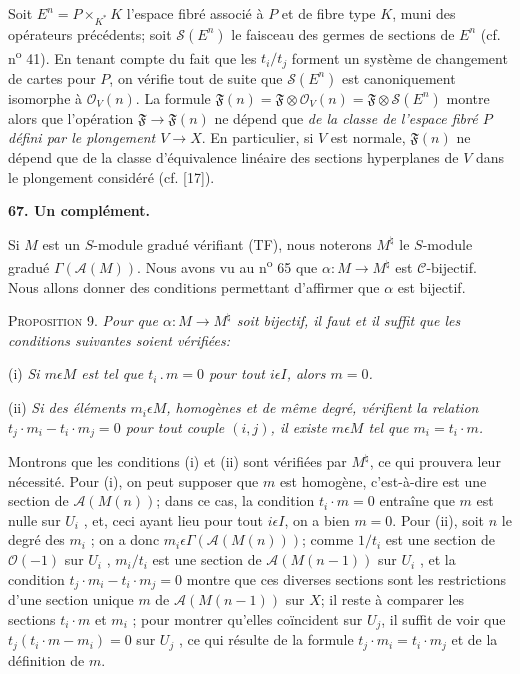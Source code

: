 Soit $E^n = P \times_{K^*} K$ l'espace fibré associé à $P$ et de fibre type $K$, muni des opérateurs précédents; soit $\mathcal{S}(E^n)$ le faisceau des germes de sections de $E^n$ (cf. n\textsuperscript{o} 41). En tenant compte du fait que les $t_i/t_j$ forment un système de changement de cartes pour $P$, on vérifie tout de suite que $\mathcal{S}(E^n)$ est canoniquement isomorphe à $\mathcal{O}_V(n)$. La formule $\mathfrak{F}(n) = \mathfrak{F} \otimes \mathcal{O}_V(n) = \mathfrak{F} \otimes \mathcal{S}(E^n)$ montre alors que l'opération $\mathfrak{F} \to \mathfrak{F}(n)$ ne dépend que \textit{de la classe de l'espace fibré $P$ défini par le plongement $V \to X$}. En particulier, si $V$ est normale, $\mathfrak{F}(n)$ ne dépend que de la classe d'équivalence linéaire des sections hyperplanes de $V$ dans le plongement considéré (cf. [17]).


\textbf{67. Un complément.}

Si $M$ est un $S$-module gradué vérifiant (TF), nous noterons $M^\natural$ le $S$-module gradué $\Gamma(\mathcal{A}(M))$. Nous avons vu au n\textsuperscript{o} 65 que $\alpha : M \to M^\natural$ est $\mathcal{C}$-bijectif. Nous allons donner des conditions permettant d'affirmer que $\alpha$ est bijectif.

\textsc{Proposition} 9. \textit{Pour que $\alpha : M \to M^\natural$ soit bijectif, il faut et il suffit que les conditions suivantes soient vérifiées:}

(i) \textit{Si $m \epsilon M$ est tel que $t_i\,.\,m = 0$ pour tout $i \epsilon I$, alors $m = 0$.}

(ii) \textit{Si des éléments $m_i \epsilon M$, homogènes et de même degré, vérifient la relation $t_j\cdot m_i - t_i\cdot m_j = 0$ pour tout couple $(i, j)$, il existe $m \epsilon M$ tel que $m_i = t_i\cdot m$.}

Montrons que les conditions (i) et (ii) sont vérifiées par $M^\natural$, ce qui prouvera leur nécessité. Pour (i), on peut supposer que $m$ est homogène, c'est-à-dire est une section de $\mathcal{A}(M(n))$; dans ce cas, la condition $t_i\cdot m = 0$ entraîne que $m$ est nulle sur $U_i$ , et, ceci ayant lieu pour tout $i \epsilon I$, on a bien $m = 0$. Pour (ii), soit $n$ le degré des $m_i$ ; on a donc $m_i \epsilon \Gamma(\mathcal{A}(M(n)))$; comme $1/t_i$ est une section de $\mathcal{O}(-1)$ sur $U_i$ , $m_i/t_i$ est une section de $\mathcal{A}(M(n - 1))$ sur $U_i$ , et la condition $t_j\cdot m_i - t_i\cdot m_j = 0$ montre que ces diverses sections sont les restrictions d'une section unique $m$ de $\mathcal{A}(M(n - 1))$ sur $X$; il reste à comparer les sections $t_i\cdot m$ et $m_i$ ; pour montrer qu'elles coïncident sur $U_j$, il suffit de voir que $t_j(t_i\cdot m - m_i) = 0$ sur $U_j$ , ce qui résulte de la formule $t_j\cdot m_i = t_i\cdot m_j$ et de la définition de $m$.

